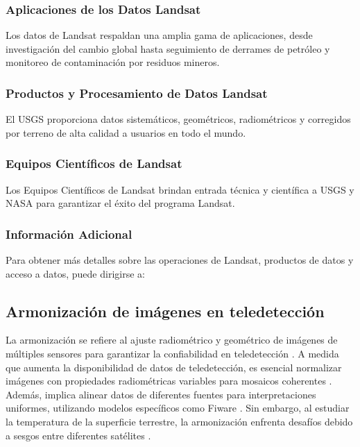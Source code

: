             \subsubsection{Aplicaciones de los Datos Landsat}
                Los datos de Landsat respaldan una amplia gama de aplicaciones, desde investigación del cambio global hasta seguimiento de derrames de petróleo y monitoreo de contaminación por residuos mineros.
                
            \subsubsection{Productos y Procesamiento de Datos Landsat}
                El USGS proporciona datos sistemáticos, geométricos, radiométricos y corregidos por terreno de alta calidad a usuarios en todo el mundo.
            
            \subsubsection{Equipos Científicos de Landsat}
                Los Equipos Científicos de Landsat brindan entrada técnica y científica a USGS y NASA para garantizar el éxito del programa Landsat.
                
            \subsubsection{Información Adicional}
                Para obtener más detalles sobre las operaciones de Landsat, productos de datos y acceso a datos, puede dirigirse a:
    
        \subsection{Armonización de imágenes en teledetección}
            La armonización se refiere al ajuste radiométrico y geométrico de imágenes de múltiples sensores para garantizar la confiabilidad en teledetección \autocite{ichikawa2022development}. A medida que aumenta la disponibilidad de datos de teledetección, es esencial normalizar imágenes con propiedades radiométricas variables para mosaicos coherentes \autocite{langheinrich2017enhanced}. Además, implica alinear datos de diferentes fuentes para interpretaciones uniformes, utilizando modelos específicos como Fiware \autocite{vosinakis2022data}. Sin embargo, al estudiar la temperatura de la superficie terrestre, la armonización enfrenta desafíos debido a sesgos entre diferentes satélites \autocite{adeniran2022cross}.
            

